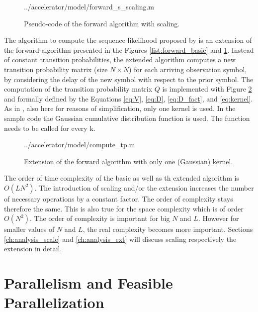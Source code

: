 \documentclass[mscthesis]{usiinfthesis}
\begin{document}
\begin{figure}
    \centering
    
        {../accelerator/model/forward_s_scaling.m}
    \caption{Pseudo-code of the forward algorithm with scaling.}
    \label{list:forward_scaling}
\end{figure}

The algorithm to compute the sequence likelihood proposed by \cite{salfner08}
is an extension of the forward algorithm presented in the Figures
\ref{list:forward_basic} and \ref{list:forward_scaling}. Instead of constant
transition probabilities, the extended algorithm computes a new transition
probability matrix (size $ N \times N$) for each arriving observation symbol,
by considering the delay of the new symbol with respect to the prior symbol.
The computation of the transition probability matrix $ Q $ is implemented with
Figure \ref{list:ext} and formally defined by the Equations \ref{eq:V},
\ref{eq:D}, \ref{eq:D_fact}, and \ref{eq:kernel}. As in \cite{salfner08}, also
here for reasons of simplification, only one kernel is used. In the sample code
the Gaussian cumulative distribution function is used. The function needs to be
called for every k.

\begin{figure}
    \centering
    
        {../accelerator/model/compute_tp.m}
        \caption{Extension of the forward algorithm with only one (Gaussian)
            kernel.}
    \label{list:ext}
\end{figure}

The order of time complexity of the basic as well as th extended algorithm is
$O(LN^2)$. The introduction of scaling and/or the extension increases the
number of necessary operations by a constant factor. The order of complexity
stays therefore the same. This is also true for the space complexity which is of
order $O(N^2)$. The order of complexity is important for big $N$ and $L$.
However for smaller values of $N$ and $L$, the real complexity becomes more
important. Sections \ref{ch:analysis_scale} and \ref{ch:analysis_ext} will
discuss scaling respectively the extension in detail.

\section{Parallelism and Feasible Parallelization}
\label{ch:analysis_parallel}
\end{document}
